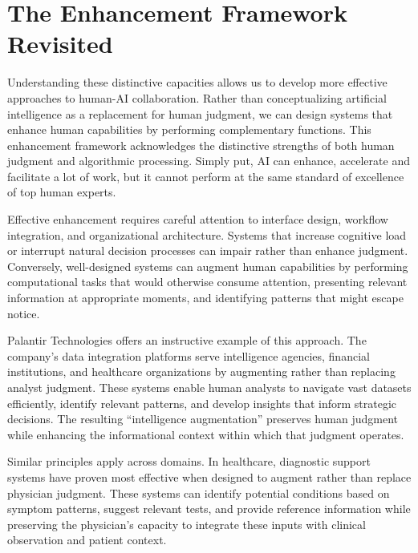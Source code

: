 \documentclass[
  Letterpaper,
]{scrbook}
\begin{document}
\section{\texorpdfstring{The
Enhancement Framework
Revisited}{The Enhancement Framework Revisited}}\label{the-enhancement-framework-revisited}

Understanding these distinctive capacities allows us to develop more
effective approaches to human-AI
collaboration.
Rather than conceptualizing artificial intelligence as a replacement for
human judgment, we can design systems that enhance human
capabilities by
performing complementary functions. This enhancement
framework acknowledges the
distinctive strengths of both human judgment and algorithmic processing.
Simply put, AI can enhance, accelerate and facilitate a lot of work, but
it cannot perform at the same standard of excellence of top human
experts.

Effective enhancement requires careful attention to interface
design, workflow
integration, and
organizational architecture. Systems that increase cognitive load or
interrupt natural decision processes can impair rather than enhance
judgment. Conversely, well-designed systems can augment human
capabilities by performing computational tasks that would otherwise
consume attention, presenting relevant information at appropriate
moments, and identifying patterns that might escape notice.

Palantir Technologies offers an instructive
example of this approach. The company's data integration platforms serve
intelligence agencies, financial institutions, and
healthcare organizations by augmenting rather than
replacing analyst judgment. These systems enable human analysts to
navigate vast datasets efficiently, identify relevant patterns, and
develop insights that inform strategic decisions. The resulting
``intelligence augmentation''
preserves human judgment while enhancing the informational context
within which that judgment operates.

Similar principles apply across domains. In healthcare, diagnostic
support systems have proven most effective when designed to augment
rather than replace physician judgment. These systems can identify
potential conditions based on symptom patterns, suggest relevant tests,
and provide reference information while preserving the physician's
capacity to integrate these inputs with clinical observation and patient
context.
\end{document}
